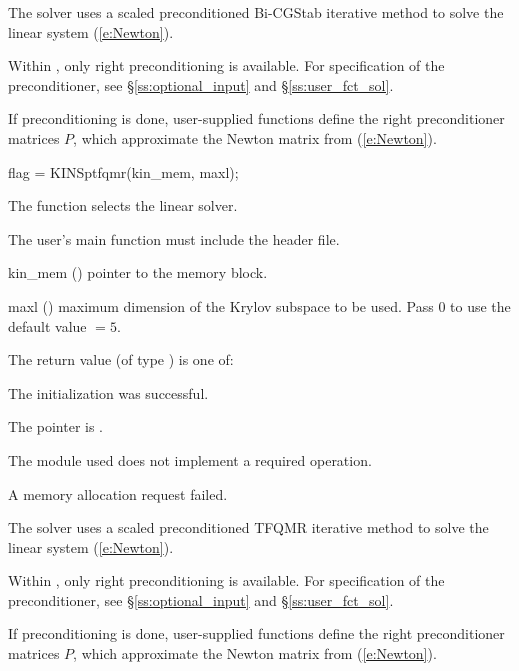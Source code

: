 {
  The {\kinspbcg} solver uses a scaled preconditioned Bi-CGStab
  iterative method to solve the linear system (\ref{e:Newton}).

  Within {\kinsol}, only right preconditioning is available.
  For specification of the preconditioner,
  see \S\ref{ss:optional_input} and \S\ref{ss:user_fct_sol}.

  If preconditioning is done, user-supplied functions define the right 
  preconditioner matrices $P$, which approximate the Newton matrix
  from (\ref{e:Newton}).
}
{
  flag = KINSptfqmr(kin\_mem, maxl);
}
{
  The function  selects the {\kinsptfqmr} linear solver.

  The user's main function must include the  header file.
}
{
  \begin{args}
  \item[kin\_mem] ()
    pointer to the {\kinsol} memory block.
  \item[maxl] ()
    maximum dimension of the Krylov subspace to be used. Pass $0$ to use the 
    default value $=5$.
  \end{args}
}
{
  The return value  (of type ) is one of:
  \begin{args}
  \item[\Id{KINSPILS\_SUCCESS}] 
    The {\kinsptfqmr} initialization was successful.
  \item[\Id{KINSPILS\_MEM\_NULL}]
    The  pointer is .
  \item[\Id{KINSPILS\_ILL\_INPUT}]
    The {\nvector} module used does not implement a required operation.
  \item[\Id{KINSPILS\_MEM\_FAIL}]
    A memory allocation request failed.
  \end{args}
}
{
  The {\kinsptfqmr} solver uses a scaled preconditioned TFQMR
  iterative method to solve the linear system (\ref{e:Newton}).

  Within {\kinsol}, only right preconditioning is available.
  For specification of the preconditioner,
  see \S\ref{ss:optional_input} and \S\ref{ss:user_fct_sol}.

  If preconditioning is done, user-supplied functions define the right 
  preconditioner matrices $P$, which approximate the Newton matrix
  from (\ref{e:Newton}).
}

